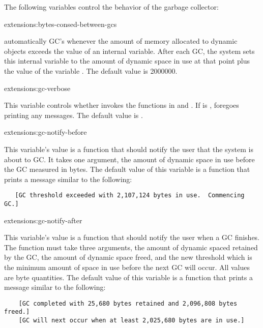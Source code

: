 The following variables control the behavior of the garbage collector:

\begin{defvar}{extensions:}{bytes-consed-between-gcs}
  
  \cmucl{} automatically GC's whenever the amount of memory
  allocated to dynamic objects exceeds the value of an internal
  variable.  After each GC, the system sets this internal variable to
  the amount of dynamic space in use at that point plus the value of
  the variable .  The default
  value is 2000000.
\end{defvar}

\begin{defvar}{extensions:}{gc-verbose}
  
  This variable controls whether  invokes the functions
  in  and
  .  If  is \nil,
   foregoes printing any messages.  The default value is
  .
\end{defvar}

\begin{defvar}{extensions:}{gc-notify-before}
  
  This variable's value is a function that should notify the user that
  the system is about to GC.  It takes one argument, the amount of
  dynamic space in use before the GC measured in bytes.  The default
  value of this variable is a function that prints a message similar
  to the following:
\begin{verbatim}
   [GC threshold exceeded with 2,107,124 bytes in use.  Commencing GC.]
\end{verbatim}
\end{defvar}

\begin{defvar}{extensions:}{gc-notify-after}
  
  This variable's value is a function that should notify the user when
  a GC finishes.  The function must take three arguments, the amount
  of dynamic spaced retained by the GC, the amount of dynamic space
  freed, and the new threshold which is the minimum amount of space in
  use before the next GC will occur.  All values are byte quantities.
  The default value of this variable is a function that prints a
  message similar to the following:
  \begin{verbatim}
    [GC completed with 25,680 bytes retained and 2,096,808 bytes freed.]
    [GC will next occur when at least 2,025,680 bytes are in use.]
  \end{verbatim}
\end{defvar}

